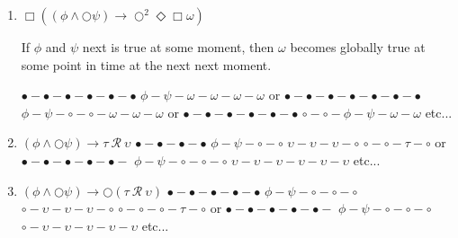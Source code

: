 \documentclass[12pt]{article}
\begin{document}
\begin{enumerate}
	\item $\Box ((\phi \wedge \bigcirc \psi) \rightarrow \bigcirc^{2} \Diamond \Box \omega)$
	
	If $\phi$ and $\psi$ next is true at some moment, then $\omega$ becomes globally true at some point in time at the next next moment. 
	
	$\bullet-\bullet-\bullet-\bullet-\bullet-\bullet$ \newline
	$\phi-\psi-\omega-\omega-\omega-\omega$ \newline
	or \newline
	$\bullet-\bullet-\bullet-\bullet-\bullet-\bullet-\bullet$ \newline
	$\phi-\psi-\circ-\circ-\omega-\omega-\omega$ \newline
	or \newline
	$\bullet-\bullet-\bullet-\bullet-\bullet-\bullet$ \newline
	$\circ-\circ-\phi-\psi-\omega-\omega$ \newline
	etc...
	
	\item $(\phi \wedge \bigcirc \psi) \rightarrow \tau ~\mathcal{R}~ \upsilon$ \newline
	$\bullet-\bullet-\bullet-\bullet$ \newline
	$\phi-\psi-\circ-\circ$ \newline
	$\upsilon-\upsilon-\upsilon-\circ$ \newline
	$\circ-\circ-\tau-\circ$ \newline
	or \newline
	$\bullet-\bullet-\bullet-\bullet-\bullet-$ \newline
	$\phi-\psi-\circ-\circ-\circ$ \newline
	$\upsilon-\upsilon-\upsilon-\upsilon-\upsilon-\upsilon$ \newline
	etc...
	
	\item $(\phi \wedge \bigcirc \psi) \rightarrow \bigcirc (\tau ~\mathcal{R}~ \upsilon)$ \newline
	$\bullet-\bullet-\bullet-\bullet-\bullet$ \newline
	$\phi-\psi-\circ-\circ-\circ$ \newline
	$\circ-\upsilon-\upsilon-\upsilon-\circ$ \newline
	$\circ-\circ-\circ-\tau-\circ$ \newline
	or \newline
	$\bullet-\bullet-\bullet-\bullet-\bullet-$ \newline
	$\phi-\psi-\circ-\circ-\circ$ \newline
	$\circ-\upsilon-\upsilon-\upsilon-\upsilon-\upsilon$ \newline
	etc...


\end{enumerate}
\end{document}
